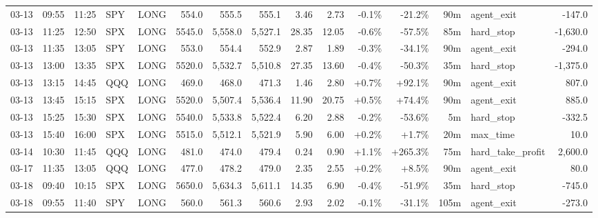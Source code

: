 \documentclass[11pt,a4paper,twoside]{article}
\begin{document}
\begin{landscape}
\begin{center}
\begin{longtable}{>{\color{txtmain}}l l l l l r r r r r r r r >{\color{txtmain}}l r}
03-13 & 09:55 & 11:25 & SPY & LONG & 554.0 & 555.5 & 555.1 & 3.46 & 2.73 & \textcolor{lossred}{-0.1\%} & \textcolor{lossred}{-21.2\%} & 90m & agent\_exit & \textcolor{lossred}{-147.0} \\
03-13 & 11:25 & 12:50 & SPX & LONG & 5545.0 & 5,558.0 & 5,527.1 & 28.35 & 12.05 & \textcolor{lossred}{-0.6\%} & \textcolor{lossred}{-57.5\%} & 85m & hard\_stop & \textcolor{lossred}{-1,630.0} \\
03-13 & 11:35 & 13:05 & SPY & LONG & 553.0 & 554.4 & 552.9 & 2.87 & 1.89 & \textcolor{lossred}{-0.3\%} & \textcolor{lossred}{-34.1\%} & 90m & agent\_exit & \textcolor{lossred}{-294.0} \\
03-13 & 13:00 & 13:35 & SPX & LONG & 5520.0 & 5,532.7 & 5,510.8 & 27.35 & 13.60 & \textcolor{lossred}{-0.4\%} & \textcolor{lossred}{-50.3\%} & 35m & hard\_stop & \textcolor{lossred}{-1,375.0} \\
03-13 & 13:15 & 14:45 & QQQ & LONG & 469.0 & 468.0 & 471.3 & 1.46 & 2.80 & \textcolor{wingreen}{+0.7\%} & \textcolor{wingreen}{+92.1\%} & 90m & agent\_exit & \textcolor{wingreen}{807.0} \\
03-13 & 13:45 & 15:15 & SPX & LONG & 5520.0 & 5,507.4 & 5,536.4 & 11.90 & 20.75 & \textcolor{wingreen}{+0.5\%} & \textcolor{wingreen}{+74.4\%} & 90m & agent\_exit & \textcolor{wingreen}{885.0} \\
03-13 & 15:25 & 15:30 & SPX & LONG & 5540.0 & 5,533.8 & 5,522.4 & 6.20 & 2.88 & \textcolor{lossred}{-0.2\%} & \textcolor{lossred}{-53.6\%} & 5m & hard\_stop & \textcolor{lossred}{-332.5} \\
03-13 & 15:40 & 16:00 & SPX & LONG & 5515.0 & 5,512.1 & 5,521.9 & 5.90 & 6.00 & \textcolor{wingreen}{+0.2\%} & \textcolor{wingreen}{+1.7\%} & 20m & max\_time & \textcolor{wingreen}{10.0} \\
03-14 & 10:30 & 11:45 & QQQ & LONG & 481.0 & 474.0 & 479.4 & 0.24 & 0.90 & \textcolor{wingreen}{+1.1\%} & \textcolor{wingreen}{+265.3\%} & 75m & hard\_take\_profit & \textcolor{wingreen}{2,600.0} \\
03-17 & 11:35 & 13:05 & QQQ & LONG & 477.0 & 478.2 & 479.0 & 2.35 & 2.55 & \textcolor{wingreen}{+0.2\%} & \textcolor{wingreen}{+8.5\%} & 90m & agent\_exit & \textcolor{wingreen}{80.0} \\
03-18 & 09:40 & 10:15 & SPX & LONG & 5650.0 & 5,634.3 & 5,611.1 & 14.35 & 6.90 & \textcolor{lossred}{-0.4\%} & \textcolor{lossred}{-51.9\%} & 35m & hard\_stop & \textcolor{lossred}{-745.0} \\
03-18 & 09:55 & 11:40 & SPY & LONG & 560.0 & 561.3 & 560.6 & 2.93 & 2.02 & \textcolor{lossred}{-0.1\%} & \textcolor{lossred}{-31.1\%} & 105m & agent\_exit & \textcolor{lossred}{-273.0} \\

\end{longtable}
\end{center}
\end{landscape}
\end{document}
